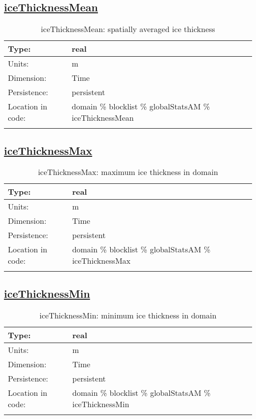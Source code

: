 \subsection[iceThicknessMean]{\hyperref[sec:var_tab_globalStatsAM]{iceThicknessMean}}
\label{subsec:var_sec_globalStatsAM_iceThicknessMean}
\begin{center}
\begin{longtable}{| p{2.0in} | p{4.0in} |}
        \hline 
        Type: & real \\
        \hline 
        Units: & \si{m} \\
        \hline 
        Dimension: & Time \\
        \hline 
        Persistence: & persistent \\
        \hline 
         Location in code: & domain \% blocklist \% globalStatsAM \% iceThicknessMean \\
         \hline 
    \caption{iceThicknessMean: spatially averaged ice thickness}
\end{longtable}
\end{center}
\subsection[iceThicknessMax]{\hyperref[sec:var_tab_globalStatsAM]{iceThicknessMax}}
\label{subsec:var_sec_globalStatsAM_iceThicknessMax}
\begin{center}
\begin{longtable}{| p{2.0in} | p{4.0in} |}
        \hline 
        Type: & real \\
        \hline 
        Units: & \si{m} \\
        \hline 
        Dimension: & Time \\
        \hline 
        Persistence: & persistent \\
        \hline 
         Location in code: & domain \% blocklist \% globalStatsAM \% iceThicknessMax \\
         \hline 
    \caption{iceThicknessMax: maximum ice thickness in domain}
\end{longtable}
\end{center}
\subsection[iceThicknessMin]{\hyperref[sec:var_tab_globalStatsAM]{iceThicknessMin}}
\label{subsec:var_sec_globalStatsAM_iceThicknessMin}
\begin{center}
\begin{longtable}{| p{2.0in} | p{4.0in} |}
        \hline 
        Type: & real \\
        \hline 
        Units: & \si{m} \\
        \hline 
        Dimension: & Time \\
        \hline 
        Persistence: & persistent \\
        \hline 
         Location in code: & domain \% blocklist \% globalStatsAM \% iceThicknessMin \\
         \hline 
    \caption{iceThicknessMin: minimum ice thickness in domain}
\end{longtable}
\end{center}
